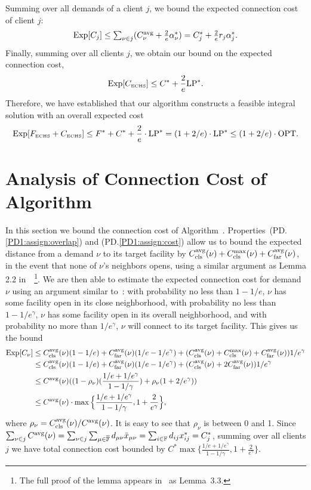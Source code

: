 \documentclass{llncs}
\begin{document}
Summing over all demands of a client $j$, we bound
the expected connection cost of client $j$:
%
\begin{equation*}
  \mbox{\rm Exp}[C_j] \leq {\textstyle\sum_{\nu\in j} (C^{{\mbox{\scriptsize\rm avg}}}_{\nu} + \frac{2}{e}\alpha_{\nu}^\ast) }
  = \textstyle{ C_j^\ast + \frac{2}{e}r_j\alpha_j^\ast}.
\end{equation*}
%
Finally, summing over all clients $j$, we obtain our bound on
the expected connection cost,
%
\begin{equation*}
	 \mbox{\rm Exp}[ C_{\mbox{\tiny\rm ECHS}}] \le C^\ast +
\frac{2}{e}\mbox{\rm LP}^\ast.
\end{equation*}
% 
Therefore, we have established that
our algorithm constructs a feasible integral solution with
an overall expected cost 
%
\begin{equation*}
  \label{eq:chudakall}
	 \mbox{\rm Exp}[ F_{\mbox{\tiny\rm ECHS}} + C_{\mbox{\tiny\rm ECHS}}]
	\le
  	F^\ast + C^\ast + \frac{2}{e}\cdot \mbox{\rm LP}^\ast = (1+2/e)\cdot \mbox{\rm LP}^\ast
  \leq (1+2/e)\cdot \mbox{\rm OPT}.
\end{equation*}
%

\section{Analysis of Connection Cost of Algorithm~{\EBGS}}
\label{app:EBGS}
In this section we bound the connection cost of
Algorithm~{\EBGS}. Properties~(PD.\ref{PD1:assign:overlap}) and
(PD.\ref{PD1:assign:cost}) allow us to bound the expected distance
from a demand $\nu$ to its target facility by
$C_{\text{cls}}^{{\mbox{\scriptsize\rm avg}}}(\nu)+C_{\text{cls}}^{\max}(\nu)+C_{\text{far}}^{{\mbox{\scriptsize\rm avg}}}(\nu)$, in the event that none of
$\nu$'s neighbors opens, using a similar argument as Lemma 2.2
in~\cite{ByrkaGS10}~\footnote{The full proof of the lemma appears
  in~\cite{ByrkaA10} as Lemma~3.3.}. We are then able to estimate the
expected connection cost for demand $\nu$ using an argument similar
to~\cite{ByrkaGS10}: with probability no less than $1-1/e$, $\nu$ has
some facility open in its close neighborhood, with probability no less
than $1-1/e^\gamma$, $\nu$ has some facility open in its overall
neighborhood, and with probability no more than $1/e^\gamma$, $\nu$
will connect to its target facility.  This gives us the bound
%
\begin{align*}
  \mbox{\rm Exp}[C_{\nu}] &\leq C_{\text{cls}}^{{\mbox{\scriptsize\rm avg}}}(\nu)(1-1/e) +
  C_{\text{far}}^{{\mbox{\scriptsize\rm avg}}}(\nu)(1/e-1/e^\gamma) + (C_{\text{cls}}^{{\mbox{\scriptsize\rm avg}}}(\nu)+C_{\text{cls}}^{\max}(\nu)+C_{\text{far}}^{{\mbox{\scriptsize\rm avg}}}(\nu))1/e^\gamma \\
  &\leq C_{\text{cls}}^{{\mbox{\scriptsize\rm avg}}}(\nu)(1-1/e) +
  C_{\text{far}}^{{\mbox{\scriptsize\rm avg}}}(\nu)(1/e-1/e^\gamma) + (C_{\text{cls}}^{{\mbox{\scriptsize\rm avg}}}(\nu)+2C_{\text{far}}^{{\mbox{\scriptsize\rm avg}}}(\nu))1/e^\gamma\\
  &\leq
  C^{{\mbox{\scriptsize\rm avg}}}(\nu)((1-\rho_{\nu})(\frac{1/e+1/e^\gamma}{1-1/\gamma})
  + \rho_{\nu}(1+2/e^\gamma)) \\
  &\leq C^{{\mbox{\scriptsize\rm avg}}}(\nu) \cdot
  \max\Big\{\frac{1/e+1/e^\gamma}{1-1/\gamma},
  1+\frac{2}{e^\gamma}\Big\},
\end{align*}
%
where $\rho_{\nu}=C_{\text{cls}}^{{\mbox{\scriptsize\rm avg}}}(\nu)/C^{{\mbox{\scriptsize\rm avg}}}(\nu)$. It is easy to see that
$\rho_{\nu}$ is between 0 and 1.  Since $\sum_{\nu\in j} C^{{\mbox{\scriptsize\rm avg}}}(\nu)
= \sum_{\nu\in j}\sum_{\mu\in\overline{\mathbb{F}}} d_{\mu\nu}{\bar x}_{\mu\nu} =
\sum_{i\in\mathbb{F}} d_{ij}x_{ij}^\ast = C_j^\ast$, summing over all
clients $j$ we have total connection cost bounded by $C^\ast
\max\{\frac{1/e+1/e^\gamma}{1-1/\gamma}, 1+\frac{2}{e^\gamma}\}$.
\end{document}
